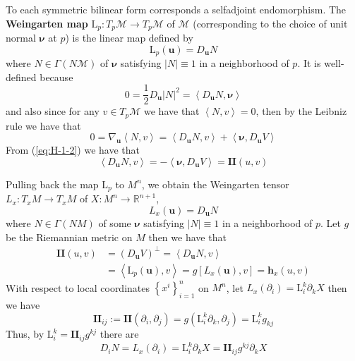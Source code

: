 To each symmetric bilinear form corresponds a selfadjoint endomorphism. The \textbf{Weingarten map} $\mathrm{L}_p:T_p\mathcal{M}\to T_p\mathcal{M}$ of $\mathcal{M}$ (corresponding to the choice of unit normal $\boldsymbol{\nu}$ at $p$) is the linear map defined by
\begin{equation*}
    \mathrm{L}_p(\boldsymbol{u})=D_{\boldsymbol{u}}N
\end{equation*}
where $N\in\Gamma(N\mathcal{M})$ of $\boldsymbol{\nu}$ satisfying $\left|N\right|\equiv 1$ in a neighborhood of $p$. It is well-defined because
\begin{equation*}
    0=\frac{1}{2}D_{\boldsymbol{u}} {\left|N\right|}^2=\left<D_{\boldsymbol{u}}N,\boldsymbol{\nu}\right>
\end{equation*}
and also since for any $v\in T_p\mathcal{M}$ we have that $\left<N,v\right>=0$, then by the Leibniz rule we have that
\begin{equation*}
    0=\nabla_{\boldsymbol{u}}\left<N,v\right>=\left<D_{\boldsymbol{u}}N,v\right>+\left<\boldsymbol{\nu},D_{\boldsymbol{u}}V\right>
\end{equation*}
From (\ref{eq:H-1-2}) we have that
\begin{equation*}
    \left<D_{\boldsymbol{u}}N,v\right>=-\left<\boldsymbol{\nu},D_{\boldsymbol{u}}V\right>=\mathbf{II}(u,v)
\end{equation*}

Pulling back the map $\mathrm{L}_p$ to $M^n$, we obtain the Weingarten tensor $L_x:T_x M\to T_x M$ of $X:M^n\to\mathbb{R}^{n+1}$,
\begin{equation*}
    L_x(\boldsymbol{u})=D_{\boldsymbol{u}}N
\end{equation*}
where $N\in\Gamma(NM)$ of some $\boldsymbol{\nu}$ satisfying $\left|N\right|\equiv 1$ in a neighborhood of $p$. Let $g$ be the Riemannian metric on $M$ then we have that
\begin{align*}
    \mathbf{II}(u,v)&={(D_{\boldsymbol{u}}V)}^\bot=\left<D_{\boldsymbol{u}}N,v\right>\\
    &=\left<\mathrm{L}_p(\boldsymbol{u}),v\right>=g[L_x(\boldsymbol{u}),v]={\boldsymbol{h}}_x(u,v)
\end{align*}
With respect to local coordinates ${\left\{x^i\right\}}^n_{i=1}$ on $M^n$, let $L_x(\partial_i)={\mathrm{L}}^k_i\partial_k X$ then we have
\begin{equation*}
    \mathbf{II}_{ij}:=\mathbf{II}(\partial_i,\partial_j)=g\left({\mathrm{L}}^k_i\partial_k,\partial_j\right)={\mathrm{L}}^k_i g_{kj}
\end{equation*}
Thus, by ${\mathrm{L}}^k_i=\mathbf{II}_{ij} g^{kj}$ there are
\begin{equation}\label{eq:H-1-4}
    D_i N=L_x(\partial_i)={\mathrm{L}}^k_i\partial_k X=\mathbf{II}_{ij} g^{kj}\partial_k X
\end{equation}

